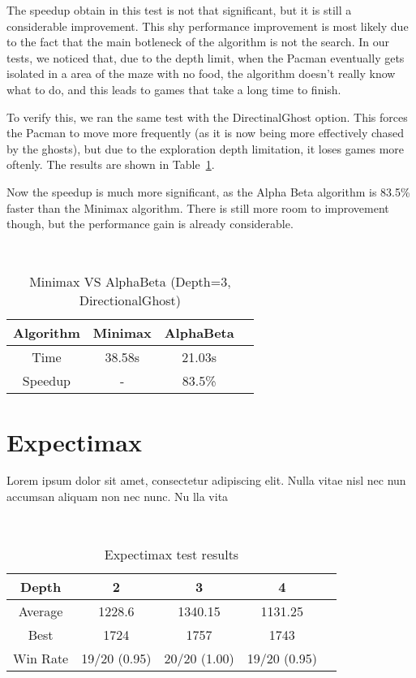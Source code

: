 \documentclass{article}
\begin{document}
The speedup obtain in this test is not that significant, but it is still a considerable improvement. This shy performance improvement is most likely due to the fact that the main botleneck of the algorithm is not the search. In our tests, we noticed that, due to the depth limit, when the Pacman eventually gets isolated in a area of the maze with no food, the algorithm doesn't really know what to do, and this leads to games that take a long time to finish.

To verify this, we ran the same test with the DirectinalGhost option. This forces the Pacman to move more frequently (as it is now being more effectively chased by the ghosts), but due to the exploration depth limitation, it loses games more oftenly. The results are shown in Table~\ref{tab:minimax_vs_alphabeta2}.

Now the speedup is much more significant, as the Alpha Beta algorithm is 83.5\% faster than the Minimax algorithm. There is still more room to improvement though, but the performance gain is already considerable.

~\\
\begin{table}[!ht]
  \begin{center}
    \begin{tabular}{||c||c|c|c||}
      \hline
      Algorithm & Minimax & AlphaBeta \\
      \hline\hline
      Time & 38.58s & 21.03s \\
      \hline\hline
      Speedup & - & 83.5\% \\
      \hline
    \end{tabular}
    \caption{Minimax VS AlphaBeta (Depth=3, DirectionalGhost)}
    \label{tab:minimax_vs_alphabeta2}
  \end{center}
\end{table}

\pagebreak
\section{Expectimax}

Lorem ipsum dolor sit amet, consectetur adipiscing elit. Nulla vitae nisl nec nun accumsan aliquam non nec nunc. Nu lla vita

~\\
\begin{table}[!ht]
  \begin{center}
    \begin{tabular}{||c||c|c|c|c||}
      \hline
      Depth & 2 & 3 & 4 \\
      \hline\hline
      Average &  1228.6 &  1340.15 &  1131.25 \\
      \hline\hline
      Best & 1724 & 1757 & 1743 \\
      \hline\hline
      Win Rate & 19/20 (0.95) & 20/20 (1.00) & 19/20 (0.95) \\
      \hline
    \end{tabular}
    \caption{Expectimax test results}
    \label{tab:alphabeta}
  \end{center}
\end{table}
\end{document}

